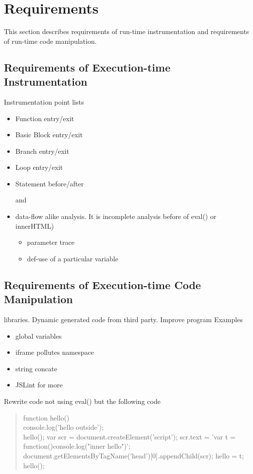 \documentclass[a4paper,twocolumn,10pt]{article}
\def\denseitems{
  \itemsep1pt plus1pt minus1pt
  \parsep0pt plus0pt
  \parskip0pt\topsep0pt}
\begin{document}
\section{Requirements}
This section describes requirements of run-time instrumentation and requirements of run-time code manipulation.
\subsection{Requirements of Execution-time Instrumentation}
Instrumentation point lists
\begin{itemize}\denseitems
  \item Function entry/exit
  \item Basic Block entry/exit
  \item Branch entry/exit
  \item Loop entry/exit
  \item Statement before/after

\noindent and
  \item data-flow alike analysis. It is incomplete analysis before of eval() or innerHTML)
  \begin{itemize}\denseitems
    \item parameter trace
    \item def-use of a particular variable
  \end{itemize}
\end{itemize}


\subsection{Requirements of Execution-time Code Manipulation}
libraries. Dynamic generated code from third party. Improve program Examples
\begin{itemize}\denseitems
    \item global variables
    \item iframe pollutes namespace
    \item string concate
    \item JSLint for more
\end{itemize}

Rewrite code not using eval() but the following code
\begin{quote}
    function hello(){\\
		console.log('hello outside');\\
	}	
	hello();
	var scr = document.createElement('script');
	scr.text = 'var t = function(){console.log("inner hello")}';
	document.getElementsByTagName('head')[0].appendChild(scr);
	hello = t;
	hello();
\end{quote}
\end{document}
